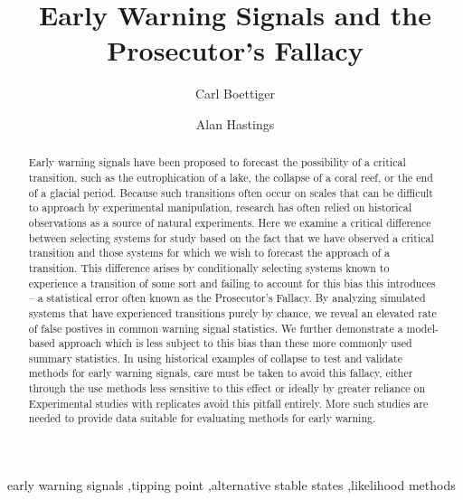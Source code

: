 \documentclass[authoryear,review,12pt]{elsarticle}
\begin{document}
\begin{frontmatter}
  \title{Early Warning Signals and the Prosecutor's Fallacy}
  \author[cpb]{Carl Boettiger}
  \author[esp]{Alan Hastings}
  \address[cpb]{Center for Population Biology, 1 Shields Avenue, University of California, Davis, CA, 95616 United States.}
  \address[esp]{Department of Environmental Science and Policy, University of California, Davis} 


  \begin{abstract}

  Early warning signals have been proposed to forecast the possibility
  of a critical transition, such as the eutrophication of a lake,
  the collapse of a coral reef, or the end
  of a glacial period.  Because such transitions often occur on scales that
  can be difficult to approach by experimental manipulation, research
  has often relied on historical observations as a source of natural experiments.
  Here we examine a critical difference between selecting systems for
  study based on the fact that we have observed a critical transition
  and those systems for which we wish to forecast the approach of a
  transition. This difference arises by conditionally selecting systems
  known to experience a transition of some sort and failing to account
  for this bias this introduces -- a statistical error often known as the
  Prosecutor's Fallacy.  By analyzing simulated systems that have
  experienced transitions purely by chance, we reveal an elevated rate
  of false postives in common warning signal statistics. We further
  demonstrate a model-based approach which is less subject to this bias
  than these more commonly used summary statistics.
  In using historical examples of collapse to test and validate methods
  for early warning signals, care must be taken to avoid this fallacy,
  either through the use methods less sensitive to this effect or ideally
  by greater reliance on Experimental studies with replicates avoid this 
  pitfall entirely.  More such studies are needed to provide data suitable
  for evaluating methods for early warning.
 
  \end{abstract}

  \begin{keyword}
early warning signals \sep tipping point \sep alternative stable states \sep likelihood methods 
   \end{keyword}
 \end{frontmatter}
\end{document}
